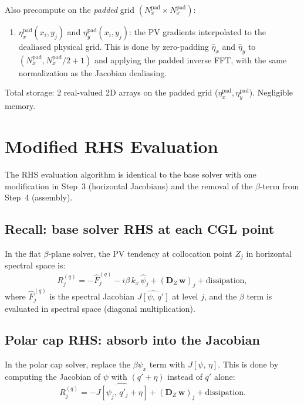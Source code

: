 \documentclass[11pt]{article}
\newcommand{\Jac}[2]{J\!\left[#1,\,#2\right]}
\newcommand{\hhat}[1]{\widehat{#1}}
\newcommand{\Dvec}{\bm{D}}
\begin{document}
Also precompute on the \emph{padded} grid $(N_x^{\mathrm{pad}} \times N_x^{\mathrm{pad}})$:
\begin{enumerate}
\item $\eta_x^{\mathrm{pad}}(x_i, y_j)$ and $\eta_y^{\mathrm{pad}}(x_i, y_j)$: the PV gradients interpolated to the dealiased physical grid. This is done by zero-padding $\hhat\eta_x$ and $\hhat\eta_y$ to $(N_x^{\mathrm{pad}}, N_x^{\mathrm{pad}}/2+1)$ and applying the padded inverse FFT, with the same normalization as the Jacobian dealiasing.
\end{enumerate}

Total storage: 2 real-valued 2D arrays on the padded grid ($\eta_x^{\mathrm{pad}}, \eta_y^{\mathrm{pad}}$). Negligible memory.

\section{Modified RHS Evaluation}
\label{sec:rhs}

The RHS evaluation algorithm is identical to the base solver with one modification in Step~3 (horizontal Jacobians) and the removal of the $\beta$-term from Step~4 (assembly).

\subsection{Recall: base solver RHS at each CGL point}

In the flat $\beta$-plane solver, the PV tendency at collocation point $Z_j$ in horizontal spectral space is:
\begin{equation}
R^{(q)}_j = -\hhat{F}^{(q)}_j - i\beta\,k_x\,\hhat\psi_j + (\Dvec_Z\,\bm{w})_j + \text{dissipation},
\label{eq:rhs_beta}
\end{equation}
where $\hhat{F}^{(q)}_j$ is the spectral Jacobian $\widehat{\Jac{\psi}{q'}}$ at level $j$, and the $\beta$ term is evaluated in spectral space (diagonal multiplication).

\subsection{Polar cap RHS: absorb into the Jacobian}

In the polar cap solver, replace the $\beta\psi_x$ term with $\Jac{\psi}{\eta}$. This is done by computing the Jacobian of $\psi$ with $(q' + \eta)$ instead of $q'$ alone:
\begin{equation}
R^{(q)}_j = -\widehat{\Jac{\psi_j}{q'_j + \eta}} + (\Dvec_Z\,\bm{w})_j + \text{dissipation}.
\label{eq:rhs_polar}
\end{equation}
\end{document}
